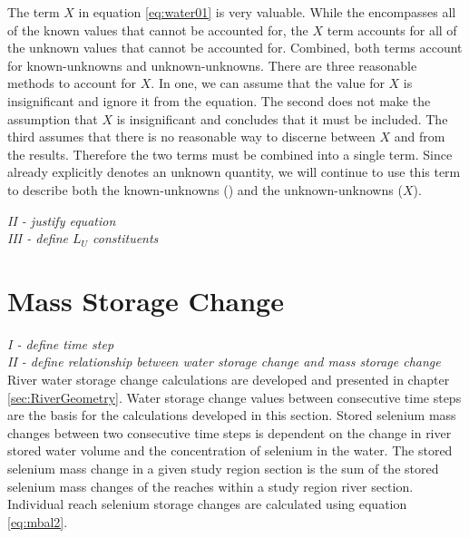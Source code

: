 \begin{linenumbers}
The term $ X $ in equation \ref{eq:water01} is very valuable.  While the \Qnps encompasses all of the known values that cannot be accounted for, the $ X $ term accounts for all of the unknown values that cannot be accounted for.  Combined, both terms account for known-unknowns and unknown-unknowns.  There are three reasonable methods to account for $ X $.  In one, we can assume that the value for $ X $ is insignificant and ignore it from the equation.  The second does not make the assumption that $ X $ is insignificant and concludes that it must be included.  The third assumes that there is no reasonable way to discerne between $ X $ and \Qnps from the results.  Therefore the two terms must be combined into a single term.  Since \Qnps already explicitly denotes an unknown quantity, we will continue to use this term to describe both the known-unknowns (\Qnps) and the unknown-unknowns ($ X $).

\emph{II - justify equation}\\

\emph{III - define $L_U$ constituents}\\

\clearpage{}
\section{Mass Storage Change}
\label{sec:MassStorageChange}

\emph{I - define time step}\\

\emph{II - define relationship between water storage change and mass storage change}\\

River water storage change calculations are developed and presented in chapter \ref{sec:RiverGeometry}.  Water storage change values between consecutive time steps are the basis for the calculations developed in this section.  Stored selenium mass changes between two consecutive time steps is dependent on the change in river stored water volume and the concentration of selenium in the water.  The stored selenium mass change in a given study region section is the sum of the stored selenium mass changes of the reaches within a study region river section.  Individual reach selenium storage changes are calculated using equation \ref{eq:mbal2}.


\end{linenumbers}
